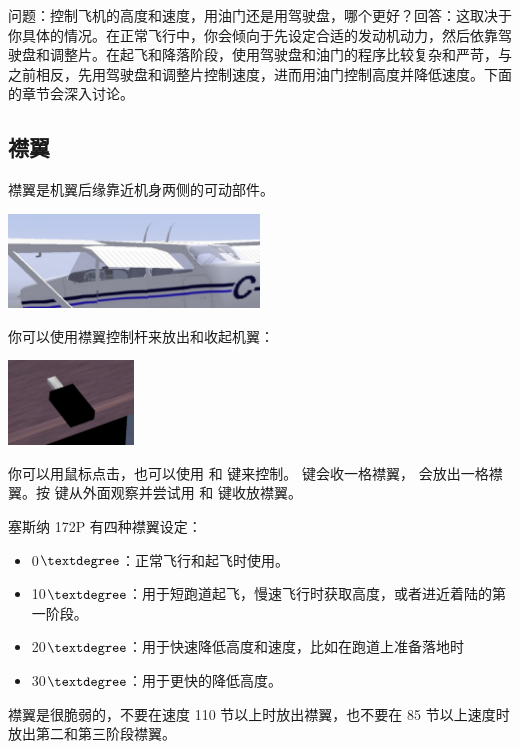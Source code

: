 问题：控制飞机的高度和速度，用油门还是用驾驶盘，哪个更好？回答：这取决于你具体的情况。在正常飞行中，你会倾向于先设定合适的发动机动力，然后依靠驾驶盘和调整片。在起飞和降落阶段，使用驾驶盘和油门的程序比较复杂和严苛，与之前相反，先用驾驶盘和调整片控制速度，进而用油门控制高度并降低速度。下面的章节会深入讨论。

\subsection{襟翼} 
\label{sec:Flaps}

襟翼是机翼后缘靠近机身两侧的可动部件。

\begin{center}
\includegraphics[width=0.5\textwidth]{img/tut_33}
\end{center}

你可以使用襟翼控制杆来放出和收起机翼：

\begin{center}
\includegraphics[width=0.25\textwidth]{img/tut_34}
\end{center}

你可以用鼠标点击，也可以使用 \key{[} 和 \key{]} 键来控制。 \key{[} 键会收一格襟翼，\key{]} 会放出一格襟翼。按   键从外面观察并尝试用 \key{[} 和 \key{]} 键收放襟翼。

塞斯纳 172P 有四种襟翼设定：
\begin{itemize}
    \item 0$\textdegree$：正常飞行和起飞时使用。
    \item 10$\textdegree$：用于短跑道起飞，慢速飞行时获取高度，或者进近着陆的第一阶段。
    \item 20$\textdegree$：用于快速降低高度和速度，比如在跑道上准备落地时 
    \item 30$\textdegree$：用于更快的降低高度。
\end{itemize}

襟翼是很脆弱的，不要在速度 110 节以上时放出襟翼，也不要在 85 节以上速度时放出第二和第三阶段襟翼。

